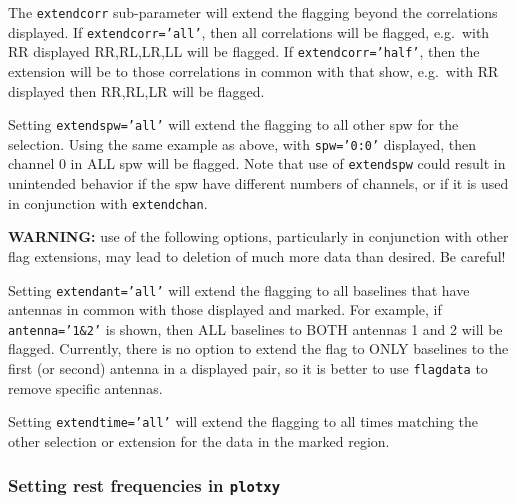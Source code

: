 The {\tt extendcorr} sub-parameter will extend the flagging beyond the
correlations displayed.  If {\tt extendcorr='all'}, then all
correlations will be flagged, e.g.\ with RR displayed RR,RL,LR,LL will 
be flagged.  If {\tt extendcorr='half'}, then the extension will be
to those correlations in common with that show, e.g.\ with RR
displayed then RR,RL,LR will be flagged.

Setting {\tt extendspw='all'} will extend the flagging to all other
spw for the selection.  Using the same example as above, with
{\tt spw='0:0'} displayed, then channel 0 in ALL spw will be flagged.
Note that use of {\tt extendspw} could result in unintended behavior
if the spw have different numbers of channels, or if it is used in
conjunction with {\tt extendchan}.

{\bf WARNING:} use of the following options, particularly in
conjunction with other flag extensions, may lead to deletion of much
more data than desired.  Be careful!

Setting {\tt extendant='all'} will extend the flagging to all
baselines that have antennas in common with those displayed and
marked.  For example, if {\tt antenna='1\&2'} is shown, then ALL
baselines to BOTH antennas 1 and 2 will be flagged.  Currently, there
is no option to extend the flag to ONLY baselines to the first (or 
second) antenna in a displayed pair, so it is better to use
{\tt flagdata} to remove specific antennas.

Setting {\tt extendtime='all'} will extend the flagging to all times 
matching the other selection or extension for the data in the marked
region.  

\subsubsection{Setting rest frequencies in {\tt plotxy}}
\label{section:edit.plot.plotxy.restfreq}


